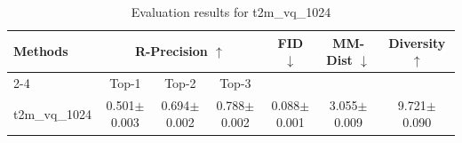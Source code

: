 \begin{table}[h]
\centering
\begin{tabular}{l ccc ccc}
\toprule
\multirow{2}{*}{\textbf{Methods}} & \multicolumn{3}{c}{\textbf{R-Precision $\uparrow$}} & \multirow{2}{*}{\textbf{FID $\downarrow$}} & \multirow{2}{*}{\textbf{MM-Dist $\downarrow$}} & \multirow{2}{*}{\textbf{Diversity $\uparrow$}} \\
\cmidrule(lr){2-4}
& Top-1 & Top-2 & Top-3 & & & \\
\midrule
t2m_vq_1024 & 0.501$\pm$0.003 & 0.694$\pm$0.002 & 0.788$\pm$0.002 & 0.088$\pm$0.001 & 3.055$\pm$0.009 & 9.721$\pm$0.090 \\
\bottomrule
\end{tabular}
\caption{Evaluation results for t2m_vq_1024}
\label{tab:results_t2m_vq_1024}
\end{table}
